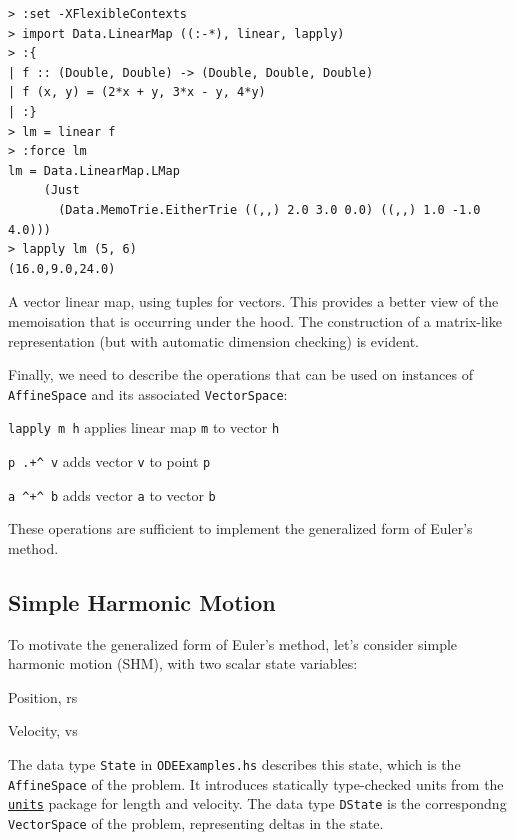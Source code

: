 \documentclass[12pt,openany]{book}
\newcommand{\filename}[1]{\texttt{#1}}  %
\newcommand{\code}[1]{\texttt{#1}}      %
\newcommand{\hspackage}[1]{\href{http://hackage.haskell.org/package/#1}{\texttt{#1}}}
\begin{document}
\begin{listing}[htbp]
\begin{verbatim}
> :set -XFlexibleContexts
> import Data.LinearMap ((:-*), linear, lapply)
> :{
| f :: (Double, Double) -> (Double, Double, Double)
| f (x, y) = (2*x + y, 3*x - y, 4*y)
| :}
> lm = linear f
> :force lm
lm = Data.LinearMap.LMap
     (Just
       (Data.MemoTrie.EitherTrie ((,,) 2.0 3.0 0.0) ((,,) 1.0 -1.0 4.0)))
> lapply lm (5, 6)
(16.0,9.0,24.0)
\end{verbatim}
\caption{A vector linear map, using tuples for vectors. This provides a better view of the memoisation that is occurring under the hood. The construction of a matrix-like representation (but with automatic dimension checking) is evident.}
\label{lst:linear-map-vector}
\end{listing}

Finally, we need to describe the operations that can be used on instances of \code{AffineSpace} and its associated \code{VectorSpace}:
\begin{pardescription}[leftmargin=6em,style=nextline]
\item [\code{lapply m h}] applies linear map \code{m} to vector \code{h}
\item [\code{p .+\^{} v}] adds vector \code{v} to point \code{p}
\item [\code{a \^{}+\^{} b}] adds vector \code{a} to vector \code{b}
\end{pardescription}
These operations are sufficient to implement the generalized form of Euler's method.

\subsection{Simple Harmonic Motion}

To motivate the generalized form of Euler's method, let's consider simple harmonic motion (SHM), with two scalar state variables:
\begin{paritemize}
\item Position, \gls{rs}
\item Velocity, \gls{vs}
\end{paritemize}
The data type \code{State} in \filename{ODEExamples.hs} describes this state, which is the \code{AffineSpace} of the problem. It introduces statically type-checked units from the \hspackage{units} package for length and velocity. The data type \code{DState} is the correspondng \code{VectorSpace} of the problem, representing deltas in the state.
\end{document}
